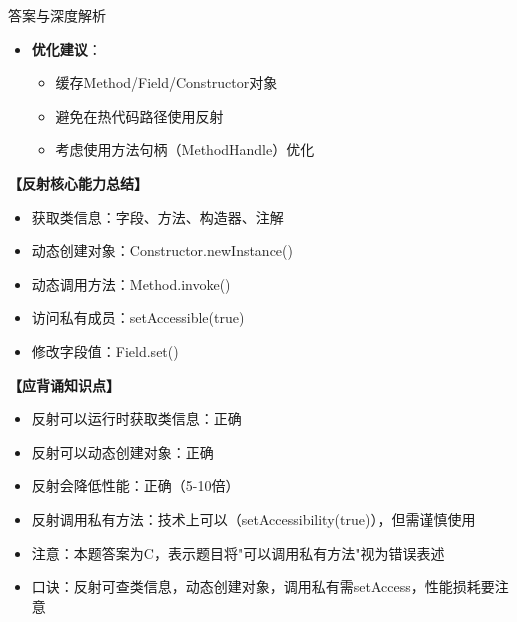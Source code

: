 \documentclass[12pt, a4paper]{ctexart}
\begin{document}
\begin{enumerate}[label=\textbf{\arabic*.}]
\begin{bluebox}{答案与深度解析}
\begin{itemize}[leftmargin=*, nosep, label={}]
\begin{itemize}[label={}, leftmargin=*, nosep]
\begin{lstlisting}[language=Java]
        // 直接调用
        long start = System.nanoTime();
        for (int i = 0; i < iterations; i++) {
            str.length();
        }
        long directTime = System.nanoTime() - start;

        // 反射调用
        Class<?> clazz = str.getClass();
        Method method = clazz.getMethod("length");
        method.setAccessible(true);

        start = System.nanoTime();
        for (int i = 0; i < iterations; i++) {
            method.invoke(str);
        }
        long reflectTime = System.nanoTime() - start;

        System.out.println("直接调用: " + directTime / 1000000 + "ms");
        System.out.println("反射调用: " + reflectTime / 1000000 + "ms");
        // 反射调用比直接调用慢5-10倍
    }
}
// 反射性能明显低于直接调用
				      \end{lstlisting}
				            \item \textbf{优化建议}：
				                  \begin{itemize}[label={}, nosep]
					                  \item 缓存Method/Field/Constructor对象
					                  \item 避免在热代码路径使用反射
					                  \item 考虑使用方法句柄（MethodHandle）优化
				                  \end{itemize}
			            \end{itemize}
		      \end{itemize}

		      \textbf{【反射核心能力总结】}
		      \begin{itemize}[label={}, nosep]
			      \item 获取类信息：字段、方法、构造器、注解
			      \item 动态创建对象：Constructor.newInstance()
			      \item 动态调用方法：Method.invoke()
			      \item 访问私有成员：setAccessible(true)
			      \item 修改字段值：Field.set()
		      \end{itemize}

		      \textbf{【应背诵知识点】}
		      \begin{itemize}[label={}, nosep]
			      \item 反射可以运行时获取类信息：正确
			      \item 反射可以动态创建对象：正确
			      \item 反射会降低性能：正确（5-10倍）
			      \item 反射调用私有方法：技术上可以（setAccessibility(true)），但需谨慎使用
			      \item 注意：本题答案为C，表示题目将"可以调用私有方法"视为错误表述
			      \item 口诀：反射可查类信息，动态创建对象，调用私有需setAccess，性能损耗要注意
		      \end{itemize}


\end{bluebox}
\end{enumerate}
\end{document}
